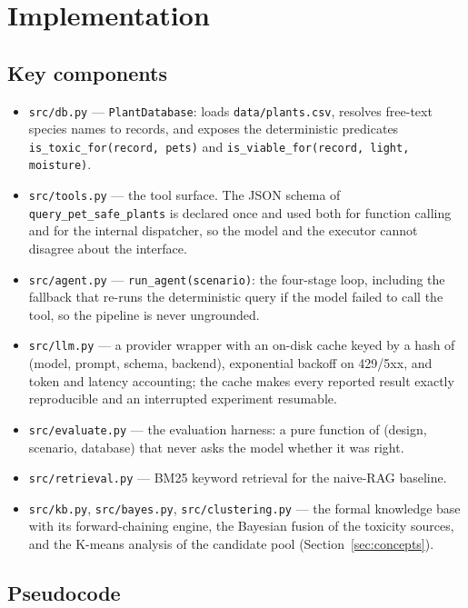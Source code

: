\documentclass[12pt,a4paper]{article}
\begin{document}
\section{Implementation}

\subsection{Key components}

\begin{itemize}
  \item \texttt{src/db.py} --- \texttt{PlantDatabase}: loads
    \texttt{data/plants.csv}, resolves free-text species names to records, and
    exposes the deterministic predicates \texttt{is\_toxic\_for(record, pets)}
    and \texttt{is\_viable\_for(record, light, moisture)}.
  \item \texttt{src/tools.py} --- the tool surface. The JSON schema of
    \texttt{query\_pet\_safe\_plants} is declared once and used both for
    function calling and for the internal dispatcher, so the model and the
    executor cannot disagree about the interface.
  \item \texttt{src/agent.py} --- \texttt{run\_agent(scenario)}: the four-stage
    loop, including the fallback that re-runs the deterministic query if the
    model failed to call the tool, so the pipeline is never ungrounded.
  \item \texttt{src/llm.py} --- a provider wrapper with an on-disk cache keyed
    by a hash of (model, prompt, schema, backend), exponential backoff on
    429/5xx, and token and latency accounting; the cache makes every reported
    result exactly reproducible and an interrupted experiment resumable.
  \item \texttt{src/evaluate.py} --- the evaluation harness: a pure function of
    (design, scenario, database) that never asks the model whether it was right.
  \item \texttt{src/retrieval.py} --- BM25 keyword retrieval for the naive-RAG
    baseline.
  \item \texttt{src/kb.py}, \texttt{src/bayes.py}, \texttt{src/clustering.py}
    --- the formal knowledge base with its forward-chaining engine, the
    Bayesian fusion of the toxicity sources, and the K-means analysis of the
    candidate pool (Section~\ref{sec:concepts}).
\end{itemize}

\subsection{Pseudocode}
\end{document}
